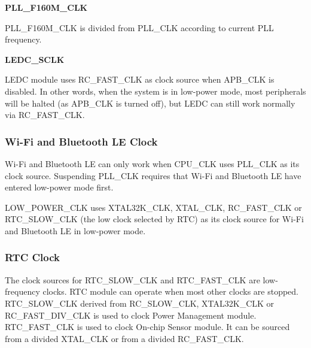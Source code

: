 \documentclass[main\_\_EN.tex]{subfiles}
\begin{document}
\textbf{PLL\_F160M\_CLK }

PLL\_F160M\_CLK is divided from PLL\_CLK according to current PLL frequency.


\textbf{LEDC\_SCLK}

LEDC module uses RC\_FAST\_CLK as clock source when APB\_CLK is disabled. In other words, when the system is in low-power mode, most peripherals will be halted (as APB\_CLK is turned off), but LEDC can still work normally via RC\_FAST\_CLK.

\subsubsection{Wi-Fi and Bluetooth LE Clock}
Wi-Fi and Bluetooth LE can only work when CPU\_CLK uses PLL\_CLK as its clock source. Suspending PLL\_CLK requires that Wi-Fi and  Bluetooth LE have entered low-power mode first.

LOW\_POWER\_CLK uses XTAL32K\_CLK, XTAL\_CLK, RC\_FAST\_CLK or RTC\_SLOW\_CLK (the low clock selected by RTC) as its clock source for Wi-Fi and Bluetooth LE in low-power mode.


\subsubsection{RTC Clock}

The clock sources for RTC\_SLOW\_CLK and RTC\_FAST\_CLK are low-frequency clocks. RTC module can operate when most other clocks are stopped. RTC\_SLOW\_CLK derived from RC\_SLOW\_CLK, XTAL32K\_CLK or RC\_FAST\_DIV\_CLK is used to clock Power Management module. RTC\_FAST\_CLK is used to clock On-chip Sensor module. It can be sourced from a divided XTAL\_CLK or from a divided RC\_FAST\_CLK.
\end{document}
